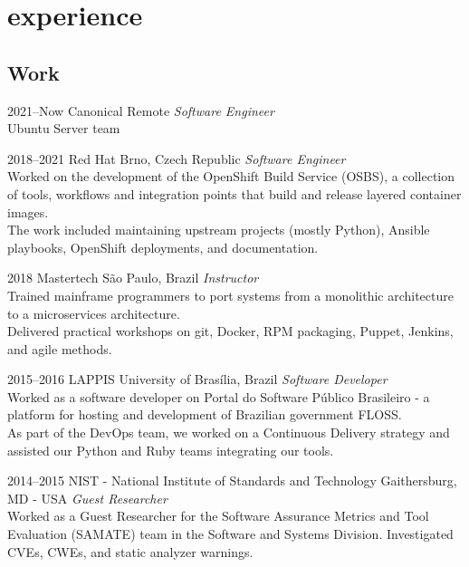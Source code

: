 \documentclass[print]{friggeri-cv}
\begin{document}

\section{experience}

\subsection{Work}

\begin{entrylist}

\entry
{2021--Now}
{Canonical}
{Remote}
{\emph{Software Engineer} \\
  Ubuntu Server team
}

\entry
{2018--2021}
{Red Hat}
{Brno, Czech Republic}
{\emph{Software Engineer} \\
  Worked on the development of the OpenShift Build Service (OSBS), a
  collection of tools, workflows and integration points that build and release
  layered container images. \\
  The work included maintaining upstream projects (mostly Python), Ansible
  playbooks, OpenShift deployments, and documentation.
}

\entry
{2018}
{Mastertech}
{São Paulo, Brazil}
{\emph{Instructor} \\
  Trained mainframe programmers to port systems from a monolithic
  architecture to a microservices architecture. \\
  Delivered practical workshops on git, Docker, RPM packaging, Puppet, Jenkins,
  and agile methods.
}

\entry
{2015--2016}
{LAPPIS}
{University of Brasília, Brazil}
{\emph{Software Developer} \\
  Worked as a software developer on Portal do Software Público
  Brasileiro - a platform for hosting and development of Brazilian government
  FLOSS. \\
  As part of the DevOps team, we worked on a Continuous Delivery strategy and
  assisted our Python and Ruby teams integrating our tools.
  }



\entry
{2014--2015}
{NIST - National Institute of Standards and Technology}
{Gaithersburg, MD - USA}
{\emph{Guest Researcher} \\
  Worked as a Guest Researcher for the Software Assurance Metrics and Tool
  Evaluation (SAMATE) team in the Software and Systems Division. Investigated
  CVEs, CWEs, and static analyzer warnings.
  }

\end{entrylist}
\end{document}
